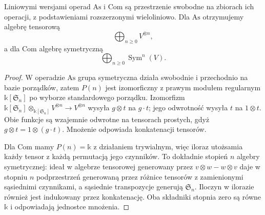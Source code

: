 \begin{przyklad}\label{cat:ex:operad-tensor-symmetric-algebras}
Liniowymi wersjami operad $\mathrm{As}$ i $\mathrm{Com}$ są przestrzenie swobodne na zbiorach ich operacji, z podstawieniami rozszerzonymi wieloliniowo. Dla $\mathrm{As}$ otrzymujemy algebrę tensorową
\[
 \bigoplus_{n\geq0}V^{\otimes n},
\]
a dla $\mathrm{Com}$ algebrę symetryczną
\[
 \bigoplus_{n\geq0}\operatorname{Sym}^n(V).
\]
\end{przyklad}
\begin{proof}
W operadzie $\mathrm{As}$ grupa symetryczna działa swobodnie i przechodnio na bazie porządków, zatem $P(n)$ jest izomorficzny z prawym modułem regularnym $\mathbb k[\mathfrak S_n]$ po wyborze standardowego porządku. Izomorfizm $\mathbb k[\mathfrak S_n]\otimes_{\mathbb k[\mathfrak S_n]}V^{\otimes n}\to V^{\otimes n}$ wysyła $g\otimes t$ na $g\cdot t$; jego odwrotność wysyła $t$ na $1\otimes t$. Obie funkcje są wzajemnie odwrotne na tensorach prostych, gdyż $g\otimes t=1\otimes(g\cdot t)$. Mnożenie odpowiada konkatenacji tensorów.

Dla $\mathrm{Com}$ mamy $P(n)=\mathbb k$ z działaniem trywialnym, więc iloraz utożsamia każdy tensor z każdą permutacją jego czynników. To dokładnie stopień $n$ algebry symetrycznej: ideał w algebrze tensorowej generowany przez $v\otimes w-w\otimes v$ daje w stopniu $n$ podprzestrzeń generowaną przez różnice tensorów z zamienionymi sąsiednimi czynnikami, a sąsiednie transpozycje generują $\mathfrak S_n$. Iloczyn w ilorazie również jest indukowany przez konkatenację. Oba składniki stopnia zero są równe $\mathbb k$ i odpowiadają jednostce mnożenia.
\end{proof}

